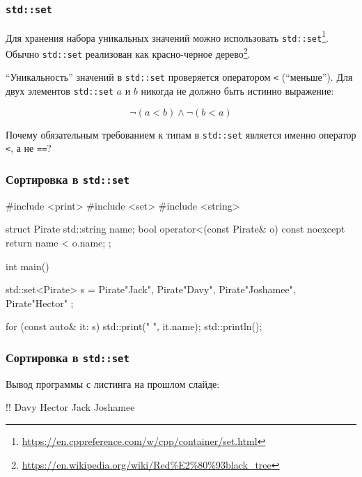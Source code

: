 \documentclass[compress, 8pt, aspectratio=169]{beamer}
\begin{document}
  \begin{frame}[fragile]

    \frametitle{\texttt{std::set}}

    Для хранения набора уникальных значений можно использовать
    \texttt{std::set}\footnote{\url{https://en.cppreference.com/w/cpp/container/set.html}}.
    Обычно \texttt{std::set} реализован как красно-черное
    дерево\footnote{\url{https://en.wikipedia.org/wiki/Red\%E2\%80\%93black\_tree}}.

    \hfill \break
    \enquote{Уникальность} значений в \texttt{std::set} проверяется оператором
    \texttt{<} (\enquote{меньше}).
    Для двух элементов \texttt{std::set} $a$ и $b$ никогда не должно быть
    истинно выражение:

    \begin{equation*}
      \neg \left(a < b\right) \land \neg \left(b < a\right)
    \end{equation*}

    \hfill \break
    \begin{task}
      Почему обязательным требованием к типам в \texttt{std::set} является
      именно оператор \texttt{<}, а не \texttt{==}?
    \end{task}

  \end{frame}

  \begin{frame}[fragile]

    \frametitle{Сортировка в \texttt{std::set}}

    \begin{mycppinplacelisting}
#include <print>
#include <set>
#include <string>

struct Pirate {
    std::string name;
    bool operator<(const Pirate& o) const noexcept {
        return name < o.name;
    }
};

int main() {
    std::set<Pirate> s = {
        Pirate{"Jack"}, Pirate{"Davy"},
        Pirate{"Joshamee"}, Pirate{"Hector"}
    };

    for (const auto& it: s) std::print("{} ", it.name);
    std::println();
}
    \end{mycppinplacelisting}

  \end{frame}

  \begin{frame}[fragile]

    \frametitle{Сортировка в \texttt{std::set}}

    Вывод программы с листинга на прошлом слайде:

    \begin{terminalwindow}
!!
Davy Hector Jack Joshamee
    \end{terminalwindow}

  \end{frame}
\end{document}
